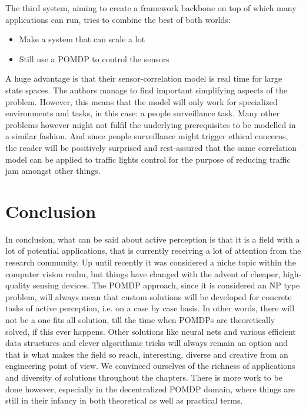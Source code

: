 \documentclass[a4paper,11pt,english]{article}
\begin{document}
The third system, aiming to create a framework backbone on top of which many applications can run, tries to combine the best of both worlds:
\begin{itemize}
\item Make a system that can scale a lot
\item Still use a POMDP to control the sensors
\end{itemize}

A huge advantage is that their sensor-correlation model is real time for large state spaces. The authors manage to find important simplifying aspects of the problem. However, this means that the model will only work for specialized environments and tasks, in this case: a people surveillance task. Many other problems however might not fulfil the underlying prerequisites to be modelled in a similar fashion. And since people surveillance might trigger ethical concerns, the reader will be positively surprised and rest-assured that the same correlation model can be applied to traffic lights control for the purpose of reducing traffic jam amongst other things.

\section{Conclusion}
In conclusion, what can be said about active perception is that it is a field with a lot of potential applications, that is currently receiving a lot of attention from the research community. Up until recently it was considered a niche topic within the computer vision realm, but things have changed with the advent of cheaper, high-quality sensing devices. The POMDP approach, since it is considered an NP type problem, will always mean that custom solutions will be developed for concrete tasks of active perception, i.e. on a case by case basis. In other words, there will not be a one fits all solution, till the time when POMDPs are theoretically solved, if this ever happens. Other solutions like neural nets and various efficient data structures and clever algorithmic tricks will always remain an option and that is what makes the field so reach, interesting, diverse and creative from an engineering point of view. We convinced ourselves of the richness of applications and diversity of solutions throughout the chapters. There is more work to be done however, especially in the decentralized POMDP domain, where things are still in their infancy in both theoretical as well as practical terms.

\newpage


\end{document}

